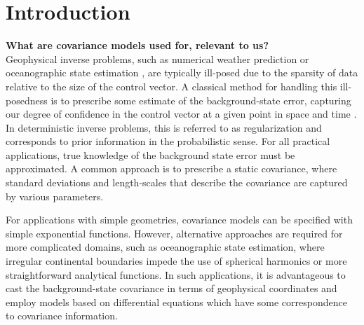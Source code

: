 \section{Introduction}
\label{sec:intro}

\textbf{What are covariance models used for, relevant to us?}\\
Geophysical inverse problems, such as numerical weather prediction  or
oceanographic state estimation , are typically ill-posed due to the
sparsity of data relative to the size of the control vector.
A classical method for handling this ill-posedness is to prescribe some estimate
of the background-state error, capturing our degree of confidence in the
control vector at a given point in space and time .
In deterministic inverse problems, this is referred to as regularization and
corresponds to prior information in the probabilistic sense.
For all practical applications, true knowledge of the background state error
must be approximated.
A common approach is to prescribe a static covariance, where standard
deviations and length-scales that describe the covariance are captured by
various parameters.

For applications with simple geometries, covariance models can be specified with
simple exponential functions.
However, alternative approaches are required for more complicated domains,
such as oceanographic state estimation,
where irregular continental boundaries impede the use of spherical harmonics or
more straightforward analytical functions.
In such applications, it is advantageous to cast the background-state covariance
in terms of geophysical coordinates and employ models based on differential
equations which have some correspondence to covariance information.

